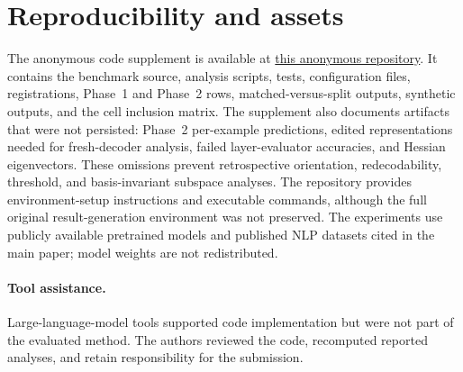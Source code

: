 \documentclass{article}
\begin{document}
\section{Reproducibility and assets}
The anonymous code supplement is available at
\href{https://anonymous.4open.science/r/Neurips-Code-Supplement-DE78}
{this anonymous repository}.
It contains the benchmark source, analysis scripts, tests, configuration files, registrations, Phase~1 and Phase~2 rows, matched-versus-split outputs, synthetic outputs, and the cell inclusion matrix. The supplement also documents artifacts that were not persisted: Phase~2 per-example predictions, edited representations needed for fresh-decoder analysis, failed layer-evaluator accuracies, and Hessian eigenvectors. These omissions prevent retrospective orientation, redecodability, threshold, and basis-invariant subspace analyses. The repository provides environment-setup instructions and executable commands, although the full original result-generation environment was not preserved. The experiments use publicly available pretrained models and published NLP datasets cited in the main paper; model weights are not redistributed.

\paragraph{Tool assistance.}
Large-language-model tools supported code implementation but were not part of the evaluated method. The authors reviewed the code, recomputed reported analyses, and retain responsibility for the submission.
\end{document}
